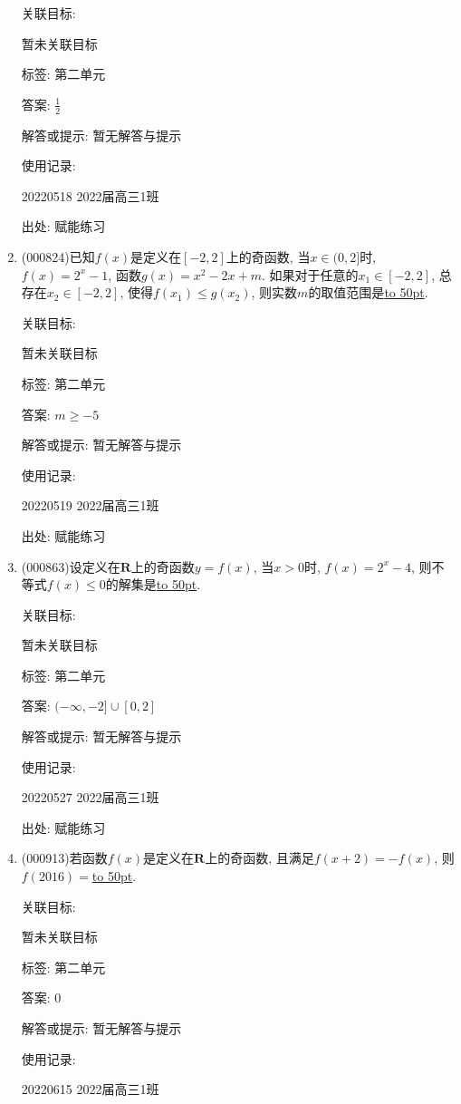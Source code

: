 \documentclass[10pt,a4paper]{article}
\newcommand{\blank}[1]{\underline{\hbox to #1pt{}}}
\begin{document}
\begin{enumerate}[1.]
关联目标:

暂未关联目标



标签: 第二单元

答案: $\frac 12$

解答或提示: 暂无解答与提示

使用记录:

20220518	2022届高三1班	


出处: 赋能练习
\item { (000824)}已知$f(x)$是定义在$[-2,2]$上的奇函数, 当$x\in (0,2]$时,$f(x)=2^x-1$, 函数$g(x)=x^2-2x+m$. 如果对于任意的$x_1\in [-2,2]$, 总存在$x_2\in [-2,2]$, 使得$f(x_1)\le g(x_2)$, 则实数$m$的取值范围是\blank{50}.


关联目标:

暂未关联目标



标签: 第二单元

答案: $m\ge -5$

解答或提示: 暂无解答与提示

使用记录:

20220519	2022届高三1班	


出处: 赋能练习
\item { (000863)}设定义在$\mathbf{R}$上的奇函数$y=f(x)$, 当$x>0$时, $f(x)=2^x-4$, 则不等式$f(x)\le 0$的解集是\blank{50}.


关联目标:

暂未关联目标



标签: 第二单元

答案: $(-\infty, -2]\cup [0,2]$

解答或提示: 暂无解答与提示

使用记录:

20220527	2022届高三1班	


出处: 赋能练习
\item { (000913)}若函数$f(x)$是定义在$\mathbf{R}$上的奇函数, 且满足$f(x+2)=-f(x)$, 则$f(2016)=$\blank{50}.


关联目标:

暂未关联目标



标签: 第二单元

答案: $0$

解答或提示: 暂无解答与提示

使用记录:

20220615	2022届高三1班	



\end{enumerate}
\end{document}
